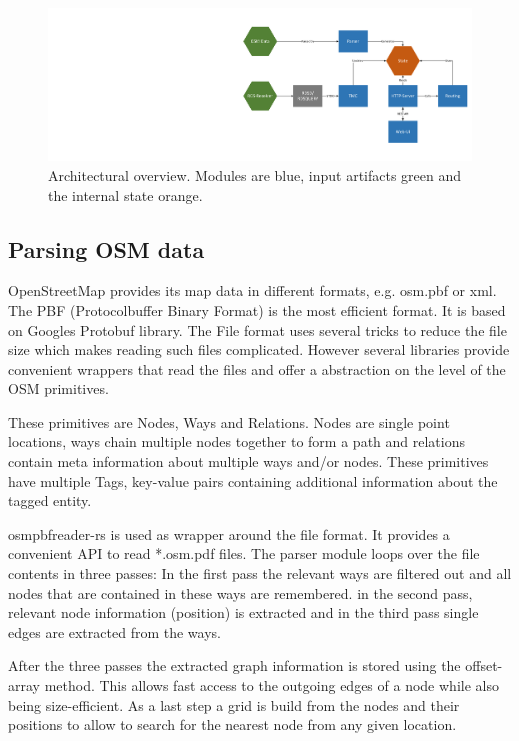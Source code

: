 \documentclass[a4paper]{scrartcl}
\begin{document}
\begin{figure}[t]
\centering
\includegraphics[width=1.0\textwidth]{img/arch_overview.pdf}
\caption{Architectural overview. Modules are blue, input artifacts green and the internal state orange.}
\label{arch}
\end{figure}

\subsection{Parsing OSM data}
\label{sec:parsing}
OpenStreetMap provides its map data in different formats, e.g. osm.pbf or xml. The PBF (Protocolbuffer Binary Format) is the most efficient format. It is based on Googles Protobuf library. The File format uses several tricks to reduce the file size which makes reading such files complicated. However several libraries provide convenient wrappers that read the files and offer a abstraction on the level of the OSM primitives.

These primitives are Nodes, Ways and Relations. Nodes are single point locations, ways chain multiple nodes together to form a path and relations contain meta information about multiple ways and/or nodes. These primitives have multiple Tags, key-value pairs containing additional information about the tagged entity.

osmpbfreader-rs \cite{osmpbfreader} is used as wrapper around the file format. It provides a convenient API to read *.osm.pdf files. The parser module loops over the file contents in three passes:
In the first pass the relevant ways are filtered out and all nodes that are contained in these ways are remembered. in the second pass, relevant node information (position) is extracted and in the third pass single edges are extracted from the ways. 

After the three passes the extracted graph information is stored using the offset-array method. This allows fast access to the outgoing edges of a node while also being size-efficient. As a last step a grid is build from the nodes and their positions to allow to search for the nearest node from any given location.
\end{document}
